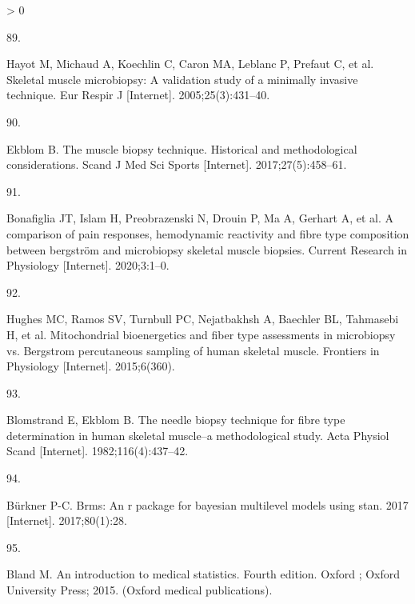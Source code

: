 \documentclass[twoside,10pt]{gihclass} %
\newlength{\cslhangindent}
\newlength{\csllabelwidth}
\newenvironment{CSLReferences}[3] %
 {%
  \setlength{\parindent}{0pt}
  \ifodd #1 \everypar{\setlength{\hangindent}{\cslhangindent}}\ignorespaces\fi
  \ifnum #2 > 0
  \setlength{\parskip}{#2\baselineskip}
  \fi
 }%
 {}
\newcommand{\CSLLeftMargin}[1]{\parbox[t]{\maxof{\widthof{#1}}{\csllabelwidth}}{#1}}
\newcommand{\CSLRightInline}[1]{\parbox[t]{\linewidth}{#1}}
\begin{document}
\begin{CSLReferences}{0}{0}
\leavevmode\hypertarget{ref-RN824}{}%
\CSLLeftMargin{89. }
\CSLRightInline{Hayot M, Michaud A, Koechlin C, Caron MA, Leblanc P, Prefaut C, et al. Skeletal muscle microbiopsy: A validation study of a minimally invasive technique. Eur Respir J {[}Internet{]}. 2005;25(3):431--40. }

\leavevmode\hypertarget{ref-RN2549}{}%
\CSLLeftMargin{90. }
\CSLRightInline{Ekblom B. The muscle biopsy technique. Historical and methodological considerations. Scand J Med Sci Sports {[}Internet{]}. 2017;27(5):458--61. }

\leavevmode\hypertarget{ref-RN2553}{}%
\CSLLeftMargin{91. }
\CSLRightInline{Bonafiglia JT, Islam H, Preobrazenski N, Drouin P, Ma A, Gerhart A, et al. A comparison of pain responses, hemodynamic reactivity and fibre type composition between bergström and microbiopsy skeletal muscle biopsies. Current Research in Physiology {[}Internet{]}. 2020;3:1--0. }

\leavevmode\hypertarget{ref-RN2552}{}%
\CSLLeftMargin{92. }
\CSLRightInline{Hughes MC, Ramos SV, Turnbull PC, Nejatbakhsh A, Baechler BL, Tahmasebi H, et al. Mitochondrial bioenergetics and fiber type assessments in microbiopsy vs. Bergstrom percutaneous sampling of human skeletal muscle. Frontiers in Physiology {[}Internet{]}. 2015;6(360). }

\leavevmode\hypertarget{ref-RN874}{}%
\CSLLeftMargin{93. }
\CSLRightInline{Blomstrand E, Ekblom B. The needle biopsy technique for fibre type determination in human skeletal muscle--a methodological study. Acta Physiol Scand {[}Internet{]}. 1982;116(4):437--42. }

\leavevmode\hypertarget{ref-RN2562}{}%
\CSLLeftMargin{94. }
\CSLRightInline{Bürkner P-C. Brms: An r package for bayesian multilevel models using stan. 2017 {[}Internet{]}. 2017;80(1):28. }

\leavevmode\hypertarget{ref-RN2007}{}%
\CSLLeftMargin{95. }
\CSLRightInline{Bland M. An introduction to medical statistics. Fourth edition. Oxford ; Oxford University Press; 2015. (Oxford medical publications). }

\end{CSLReferences}

\end{document}
